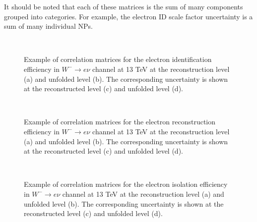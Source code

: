 It should be noted that each of these matrices is the sum of many components grouped into categories. For example, the electron ID scale factor uncertainty is a sum of many individual NPs.

\begin{figure}[h]
  \centering
   \\
  \caption{ Example of correlation matrices for the electron identification efficiency in $W^{-}\rightarrow e\nu$ channel at 13 TeV at the reconstruction level (a) and unfolded level (b). The corresponding uncertainty is shown at the reconstructed level (c) and unfolded level (d).}
  \label{fig:ElID}
\end{figure}

\begin{figure}[h]
  \centering
   \\
  \caption{ Example of correlation matrices for the electron reconstruction efficiency in $W^{-}\rightarrow e\nu$ channel at 13 TeV at the reconstruction level (a) and unfolded level (b). The corresponding uncertainty is shown at the reconstructed level (c) and unfolded level (d).}
  \label{fig:ElReco}
\end{figure}

\begin{figure}[h]
  \centering
   \\
  \caption{ Example of correlation matrices for the electron isolation efficiency in $W^{-}\rightarrow e\nu$ channel at 13 TeV at the reconstruction level (a) and unfolded level (b). The corresponding uncertainty is shown at the reconstructed level (c) and unfolded level (d).}
  \label{fig:ElIso}
\end{figure}

